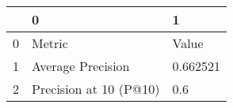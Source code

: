 \begin{tabular}{lll}
\toprule
{} &                       0 &         1 \\
\midrule
0 &                  Metric &     Value \\
1 &       Average Precision &  0.662521 \\
2 &  Precision at 10 (P@10) &       0.6 \\
\bottomrule
\end{tabular}
